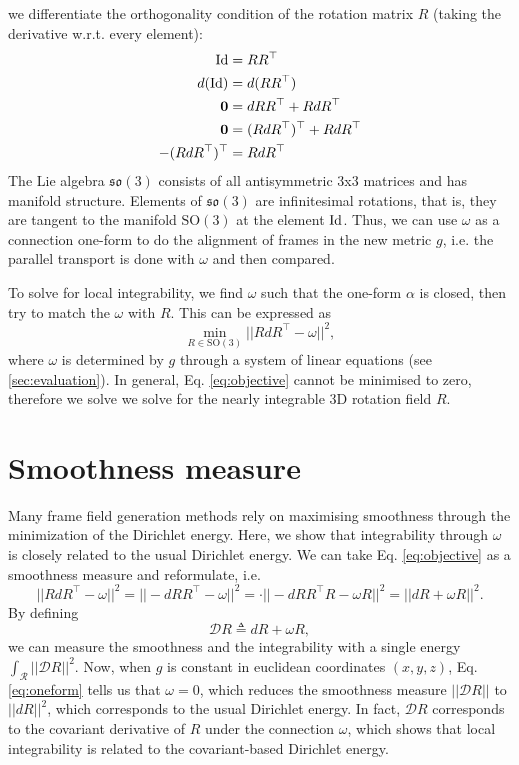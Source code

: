 \documentclass[../thesis.tex]{subfiles}
\begin{document}
we differentiate the orthogonality condition of the rotation matrix $R$ (taking the derivative w.r.t. every element):
  \begin{align*}
    \operatorname{Id} &= RR^{\top} \\
    d(\operatorname{Id}) &= d(RR^{\top}) \\
    \bm{0} &= dRR^{\top} + RdR^{\top} \\
    \bm{0} &= (RdR^{\top})^{\top} + RdR^{\top} \\
    -(RdR^{\top})^{\top} &= RdR^{\top}
  \end{align*}
The Lie algebra $\mathfrak{so}(3)$ consists of all antisymmetric 3x3 matrices and has manifold structure.
Elements of $\mathfrak{so}(3)$ are infinitesimal rotations, that is,
they are tangent to the manifold $\mathrm{SO}(3)$ at the element $\operatorname{Id}$.
Thus, we can use $\omega$ as a connection one-form to do the alignment of frames in
the new metric $g$, i.e. the parallel transport is done with $\omega$ and then compared.

To solve for local integrability, we find $\omega$ such that the one-form $\alpha$ is closed,
then try to match the $\omega$ with $R$. This can be expressed as
\begin{equation}\label{eq:objective}
  \min_{R\in \mathrm{SO}(3)} ||RdR^{\top} - \omega ||^2,
\end{equation}
where $\omega$ is determined by $g$ through a system of linear equations (see \ref{sec:evaluation}).
In general, Eq. \ref{eq:objective} cannot be minimised to zero, therefore we solve we solve
for the nearly integrable 3D rotation field $R$.

\section{Smoothness measure}
Many frame field generation methods rely on maximising smoothness through
the minimization of the Dirichlet energy.
Here, we show that integrability through $\omega$ is closely related to the usual
Dirichlet energy.
We can take Eq. \ref{eq:objective} as a smoothness measure and reformulate, i.e.
\begin{equation}\label{eq:smoothness}
  ||RdR^{\top}-\omega||^2 = ||-dRR^{\top} - \omega||^2 = \cdot||-dRR^{\top}R-\omega R||^2 = ||dR+ \omega R||^2.
\end{equation}
By defining
\begin{equation}
  \mathcal{D}R \triangleq dR + \omega R,
\end{equation}
we can measure the smoothness and the integrability with a single energy $\int_{\mathcal{R}}||\mathcal{D}R||^2$.
Now, when $g$ is constant in euclidean coordinates $(x,y,z)$, Eq. \ref{eq:oneform} tells us
that $\omega = 0$, which reduces the smoothness measure $||\mathcal{D}R||$ to 
$||dR||^2$, which corresponds to the usual Dirichlet energy.
In fact, $\mathcal{D}R$ corresponds to the covariant derivative of $R$ under
the connection $\omega$, which shows that local integrability is related
to the covariant-based Dirichlet energy.
\end{document}
